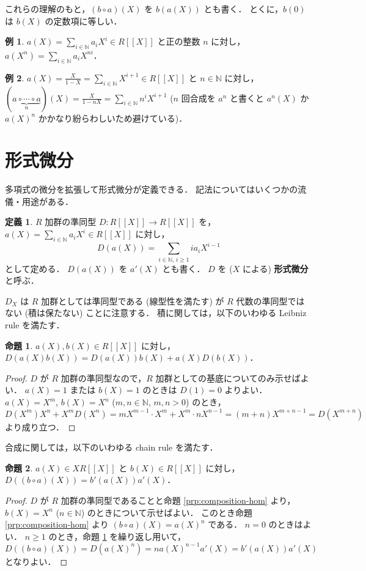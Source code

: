 \documentclass{jsarticle}
\newcommand{\N}{\mathbb{N}}
\newcommand{\longto}{\longrightarrow}
\theoremstyle{definition}
\newtheorem*{Dfn}{定義}
\newtheorem*{Exm}{例}
\newtheorem{Prp}{命題}
\newenvironment{dfn}{\vspace{1ex}\begin{screen}\begin{Dfn}}{\end{Dfn}\end{screen}\vspace{1ex}}
\newenvironment{exm}{\begin{leftbar}\begin{Exm}}{\end{Exm}\end{leftbar}}
\newenvironment{prp}{\vspace{1ex}\begin{screen}\begin{Prp}}{\end{Prp}\end{screen}}
\newenvironment{prf}{\begin{leftbar}\begin{proof}}{\end{proof}\end{leftbar}}
\begin{document}
これらの理解のもと，$(b \circ a)(X)$ を $b(a(X))$ とも書く．
とくに，$b(0)$ は $b(X)$ の定数項に等しい．

\begin{exm}
  $a(X) = \sum_{i\in\N} a_i X^i \in R[[X]]$ と正の整数 $n$ に対し，
  $a(X^n) = \sum_{i\in\N} a_i X^{ni}$．
\end{exm}

\begin{exm}
  $a(X) = \frac{X}{1 - X} = \sum_{i\in\N} X^{i+1} \in R[[X]]$ と $n \in \N$ に対し，
  $(\underbrace{a \circ \cdots \circ a}_{n})(X) = \frac{X}{1 - n X} = \sum_{i\in\N} n^i X^{i+1}$
  ($n$ 回合成を $a^n$ と書くと $a^n(X)$ か $a(X)^n$ かかなり紛らわしいため避けている)．
\end{exm}


\section{形式微分}
多項式の微分を拡張して形式微分が定義できる．
記法についてはいくつかの流儀・用途がある．

\begin{dfn}
  $R$ 加群の準同型 $D\colon R[[X]] \longto R[[X]]$ を，
  $a(X) = \sum_{i\in\N} a_i X^i \in R[[X]]$ に対し，
  \[
    D(a(X)) = \sum_{i\in\N,\,i\ge 1} i a_i X^{i-1}
  \]
  として定める．
  $D(a(X))$ を $a'(X)$ とも書く．
  $D$ を ($X$ による) \textbf{形式微分}と呼ぶ．
\end{dfn}

$D_X$ は $R$ 加群としては準同型である (線型性を満たす) が
$R$ 代数の準同型ではない (積は保たない) ことに注意する．
積に関しては，以下のいわゆる Leibniz rule を満たす．

\begin{prp}
  \label{prp:leibniz}
  $a(X), b(X) \in R[[X]]$ に対し，$D(a(X) b(X)) = D(a(X)) b(X) + a(X) D(b(X))$．
\end{prp}
\begin{prf}
  $D$ が $R$ 加群の準同型なので，$R$ 加群としての基底についてのみ示せばよい．
  $a(X) = 1$ または $b(X) = 1$ のときは $D(1) = 0$ よりよい．
  $a(X) = X^m$, $b(X) = X^n$ ($m, n \in \N$, $m, n > 0$) のとき，
  \[
    D(X^m) X^n + X^m D(X^n)
    = m X^{m-1} \cdot X^m + X^m \cdot n X^{n-1}
    = (m + n) X^{m+n-1}
    = D(X^{m+n})
  \]
  より成り立つ．
\end{prf}

合成に関しては，以下のいわゆる chain rule を満たす．

\begin{prp}
  $a(X) \in X R[[X]]$ と $b(X) \in R[[X]]$ に対し，
  $D((b \circ a)(X)) = b'(a(X)) a'(X)$．
\end{prp}
\begin{prf}
  $D$ が $R$ 加群の準同型であることと命題 \ref{prp:composition-hom} より，
  $b(X) = X^n$ ($n \in \N$) のときについて示せばよい．
  このとき命題 \ref{prp:composition-hom} より $(b \circ a)(X) = a(X)^n$ である．
  $n = 0$ のときはよい．
  $n \ge 1$ のとき，命題 \ref{prp:leibniz} を繰り返し用いて，
  \[
    D((b \circ a)(X))
    = D(a(X)^n)
    = n a(X)^{n-1} a'(X)
    = b'(a(X)) a'(X)
  \]
  となりよい．
\end{prf}
\end{document}
